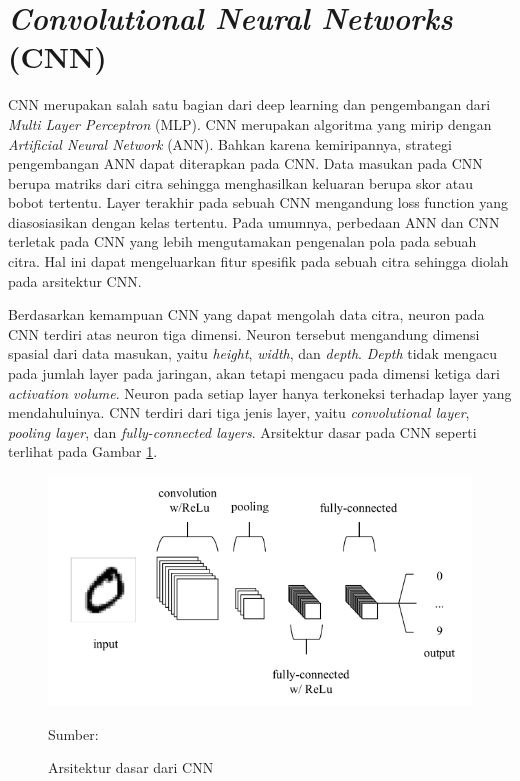 \section{\textit{Convolutional Neural Networks} (CNN)}
CNN merupakan salah satu bagian dari deep learning dan pengembangan dari \textit{Multi Layer Perceptron} (MLP). CNN merupakan algoritma yang mirip dengan \textit{Artificial Neural Network} (ANN). Bahkan karena kemiripannya, strategi pengembangan ANN dapat diterapkan pada CNN. Data masukan pada CNN berupa matriks dari citra sehingga menghasilkan keluaran berupa skor atau bobot tertentu. Layer terakhir pada sebuah CNN mengandung loss function yang diasosiasikan dengan kelas tertentu. Pada umumnya, perbedaan ANN dan CNN terletak pada CNN yang lebih mengutamakan pengenalan pola pada sebuah citra. Hal ini dapat mengeluarkan fitur spesifik pada sebuah citra sehingga diolah pada arsitektur CNN.

Berdasarkan kemampuan CNN yang dapat mengolah data citra, neuron pada CNN terdiri atas neuron tiga dimensi. Neuron tersebut mengandung dimensi spasial dari data masukan, yaitu \textit{height}, \textit{width}, dan \textit{depth}. \textit{Depth} tidak mengacu pada jumlah layer pada jaringan, akan tetapi mengacu pada dimensi ketiga dari \textit{activation volume}. Neuron pada setiap layer hanya terkoneksi terhadap layer yang mendahuluinya. CNN terdiri dari tiga jenis layer, yaitu \textit{convolutional layer}, \textit{pooling layer}, dan \textit{fully-connected layers}. Arsitektur dasar pada CNN seperti terlihat pada Gambar \ref{fig:cnn}.

\begin{figure}[H]
    \begin{center}
        \includegraphics[width=12cm]{../img/CNN Basic - Latex.png}
        \caption{Arsitektur dasar dari CNN}
        \label{fig:cnn}
        Sumber: \citep{OShea2015}
    \end{center}
\end{figure}


